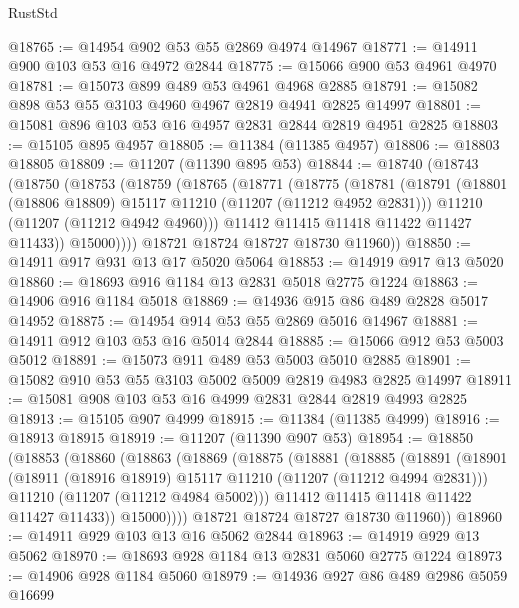 \begin{lexlean}{RustStd}
\begin{coremodule}
@18765 := @14954 @902 @53 @55 @2869 @4974 @14967
@18771 := @14911 @900 @103 @53 @16 @4972 @2844
@18775 := @15066 @900 @53 @4961 @4970
@18781 := @15073 @899 @489 @53 @4961 @4968 @2885
@18791 := @15082 @898 @53 @55 @3103 @4960 @4967 @2819 @4941 @2825 @14997
@18801 := @15081 @896 @103 @53 @16 @4957 @2831 @2844 @2819 @4951 @2825
@18803 := @15105 @895 @4957
@18805 := @11384 (@11385 @4957)
@18806 := @18803 @18805
@18809 := @11207 (@11390 @895 @53)
@18844 := @18740
    (@18743
      (@18750
        (@18753
          (@18759
            (@18765
              (@18771
                (@18775
                  (@18781
                    (@18791
                      (@18801 (@18806 @18809) @15117 @11210 (@11207 (@11212 @4952 @2831)))
                      @11210
                      (@11207 (@11212 @4942 @4960)))
                    @11412
                    @11415
                    @11418
                    @11422
                    @11427
                    @11433))
                @15000))))
        @18721
        @18724
        @18727
        @18730
        @11960))
@18850 := @14911 @917 @931 @13 @17 @5020 @5064
@18853 := @14919 @917 @13 @5020
@18860 := @18693 @916 @1184 @13 @2831 @5018 @2775 @1224
@18863 := @14906 @916 @1184 @5018
@18869 := @14936 @915 @86 @489 @2828 @5017 @14952
@18875 := @14954 @914 @53 @55 @2869 @5016 @14967
@18881 := @14911 @912 @103 @53 @16 @5014 @2844
@18885 := @15066 @912 @53 @5003 @5012
@18891 := @15073 @911 @489 @53 @5003 @5010 @2885
@18901 := @15082 @910 @53 @55 @3103 @5002 @5009 @2819 @4983 @2825 @14997
@18911 := @15081 @908 @103 @53 @16 @4999 @2831 @2844 @2819 @4993 @2825
@18913 := @15105 @907 @4999
@18915 := @11384 (@11385 @4999)
@18916 := @18913 @18915
@18919 := @11207 (@11390 @907 @53)
@18954 := @18850
    (@18853
      (@18860
        (@18863
          (@18869
            (@18875
              (@18881
                (@18885
                  (@18891
                    (@18901
                      (@18911 (@18916 @18919) @15117 @11210 (@11207 (@11212 @4994 @2831)))
                      @11210
                      (@11207 (@11212 @4984 @5002)))
                    @11412
                    @11415
                    @11418
                    @11422
                    @11427
                    @11433))
                @15000))))
        @18721
        @18724
        @18727
        @18730
        @11960))
@18960 := @14911 @929 @103 @13 @16 @5062 @2844
@18963 := @14919 @929 @13 @5062
@18970 := @18693 @928 @1184 @13 @2831 @5060 @2775 @1224
@18973 := @14906 @928 @1184 @5060
@18979 := @14936 @927 @86 @489 @2986 @5059 @16699

\end{coremodule}
\end{lexlean}
